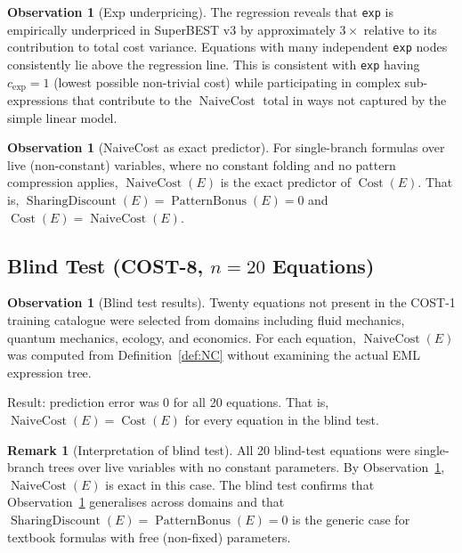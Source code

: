 \documentclass[12pt,a4paper]{article}
\theoremstyle{definition}
\newtheorem{remark}[theorem]{Remark}
\newtheorem{observation}[theorem]{Observation}
\newcommand{\Cost}{\operatorname{Cost}}
\newcommand{\NC}{\operatorname{NaiveCost}}
\newcommand{\SD}{\operatorname{SharingDiscount}}
\newcommand{\PB}{\operatorname{PatternBonus}}
\begin{document}
\begin{observation}[Exp underpricing]
\label{obs:exp-price}
The regression reveals that \texttt{exp} is empirically underpriced in
SuperBEST v3 by approximately $3\times$ relative to its contribution to total
cost variance.  Equations with many independent \texttt{exp} nodes consistently
lie above the regression line.  This is consistent with \texttt{exp} having
$c_{\exp} = 1$ (lowest possible non-trivial cost) while participating in
complex sub-expressions that contribute to the $\NC$ total in ways not captured
by the simple linear model.
\end{observation}

\begin{observation}[NaiveCost as exact predictor]
\label{obs:NC-exact}
For single-branch formulas over live (non-constant) variables, where no
constant folding and no pattern compression applies,
$\NC(E)$ is the exact predictor of $\Cost(E)$.
That is, $\SD(E) = \PB(E) = 0$ and $\Cost(E) = \NC(E)$.
\end{observation}

\subsection{Blind Test (COST-8, $n = 20$ Equations)}

\begin{observation}[Blind test results]
\label{obs:blind}
Twenty equations not present in the COST-1 training catalogue were selected
from domains including fluid mechanics, quantum mechanics, ecology, and
economics.  For each equation, $\NC(E)$ was computed from Definition~\ref{def:NC}
without examining the actual EML expression tree.

Result: prediction error was 0 for all 20 equations.
That is, $\NC(E) = \Cost(E)$ for every equation in the blind test.
\end{observation}

\begin{remark}[Interpretation of blind test]
All 20 blind-test equations were single-branch trees over live variables with
no constant parameters.  By Observation~\ref{obs:NC-exact}, $\NC(E)$ is exact
in this case.  The blind test confirms that Observation~\ref{obs:NC-exact}
generalises across domains and that $\SD(E) = \PB(E) = 0$ is the generic case
for textbook formulas with free (non-fixed) parameters.
\end{remark}
\end{document}
